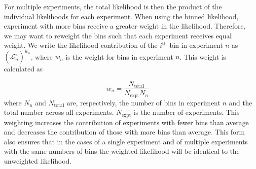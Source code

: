 For multiple experiments, the total likelihood is then the product of the individual likelihoods for each experiment. When using the binned likelihood, experiment with more bins receive a greater weight in the likelihood. Therefore, we may want to reweight the bins such that each experiment receives equal weight. We write the likelihood contribution of the $i^\textrm{th}$ bin in experiment $n$ as $(\mathcal{L}_n^i)^{w_n}$, where $w_n$ is the weight for bins in experiment $n$. This weight is calculated as

\begin{equation}
w_n = \frac{N_\textrm{total}}{N_\textrm{expt}N_n}\,
\end{equation}
where $N_n$ and $N_\textrm{total}$ are, respectively, the number of bins in experiment $n$ and the total number across all experiments. $N_\textrm{expt}$ is the number of experiments. This weighting increases the contribution of experiments with fewer bins than average and decreases the contribution of those with more bins than average. This form also ensures that in the cases of a single experiment and of multiple experiments with the same numbers of bins the weighted likelihood will be identical to the unweighted likelihood.



